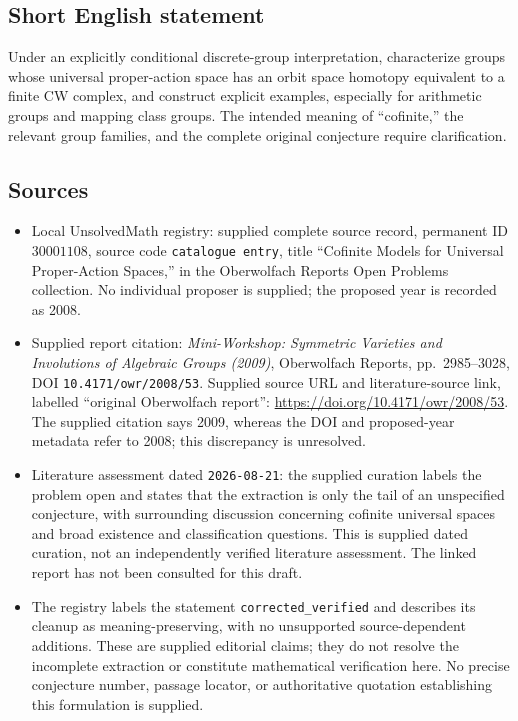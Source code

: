 \documentclass[11pt]{article}
\begin{document}
\subsection{Short English statement}
Under an explicitly conditional discrete-group interpretation, characterize groups whose universal proper-action space has an orbit space homotopy equivalent to a finite CW complex, and construct explicit examples, especially for arithmetic groups and mapping class groups. The intended meaning of ``cofinite,'' the relevant group families, and the complete original conjecture require clarification.
\subsection{Sources}
\begin{itemize}
\item Local UnsolvedMath registry: supplied complete source record, permanent ID \(30001108\), source code \texttt{catalogue entry}, title ``Cofinite Models for Universal Proper-Action Spaces,'' in the Oberwolfach Reports Open Problems collection. No individual proposer is supplied; the proposed year is recorded as 2008.
\item Supplied report citation: \emph{Mini-Workshop: Symmetric Varieties and Involutions of Algebraic Groups (2009)}, Oberwolfach Reports, pp.\ 2985--3028, DOI \texttt{10.4171/owr/2008/53}. Supplied source URL and literature-source link, labelled ``original Oberwolfach report'': \url{https://doi.org/10.4171/owr/2008/53}. The supplied citation says 2009, whereas the DOI and proposed-year metadata refer to 2008; this discrepancy is unresolved.
\item Literature assessment dated \texttt{2026-08-21}: the supplied curation labels the problem open and states that the extraction is only the tail of an unspecified conjecture, with surrounding discussion concerning cofinite universal spaces and broad existence and classification questions. This is supplied dated curation, not an independently verified literature assessment. The linked report has not been consulted for this draft.
\item The registry labels the statement \texttt{corrected\_verified} and describes its cleanup as meaning-preserving, with no unsupported source-dependent additions. These are supplied editorial claims; they do not resolve the incomplete extraction or constitute mathematical verification here. No precise conjecture number, passage locator, or authoritative quotation establishing this formulation is supplied.
\end{itemize}
\end{document}
